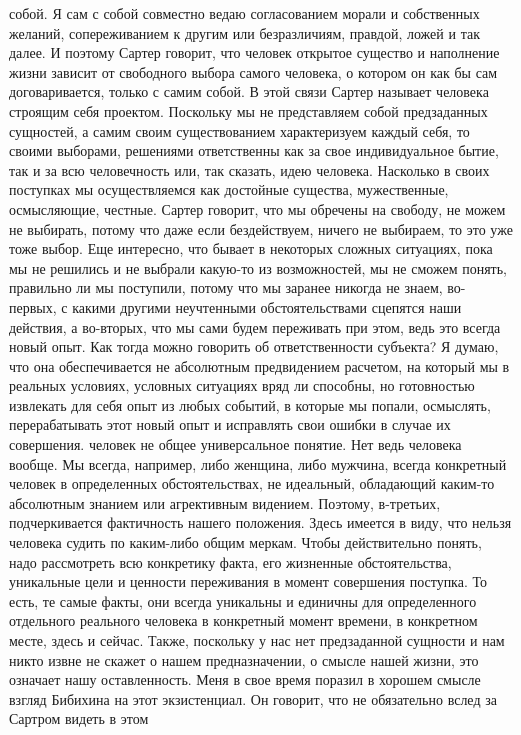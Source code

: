собой. Я сам с собой совместно ведаю согласованием морали и собственных желаний,
сопереживанием к другим или безразличиям, правдой, ложей и так далее. И поэтому
Сартер говорит, что человек открытое существо и наполнение жизни зависит от
свободного выбора самого человека, о котором он как бы сам договаривается,
только с самим собой. В этой связи Сартер называет человека строящим себя
проектом. Поскольку мы не представляем собой предзаданных сущностей, а самим
своим существованием характеризуем каждый себя, то своими выборами, решениями
ответственны как за свое индивидуальное бытие, так и за всю человечность или,
так сказать, идею человека. Насколько в своих поступках мы осуществляемся как
достойные существа, мужественные, осмысляющие, честные. Сартер говорит, что мы
обречены на свободу, не можем не выбирать, потому что даже если бездействуем,
ничего не выбираем, то это уже тоже выбор. Еще интересно, что бывает в некоторых
сложных ситуациях, пока мы не решились и не выбрали какую-то из возможностей, мы
не сможем понять, правильно ли мы поступили, потому что мы заранее никогда не
знаем, во-первых, с какими другими неучтенными обстоятельствами сцепятся наши
действия, а во-вторых, что мы сами будем переживать при этом, ведь это всегда
новый опыт. Как тогда можно говорить об ответственности субъекта? Я думаю, что
она обеспечивается не абсолютным предвидением расчетом, на который мы в реальных
условиях, условных ситуациях вряд ли способны, но готовностью извлекать для себя
опыт из любых событий, в которые мы попали, осмыслять, перерабатывать этот новый
опыт и исправлять свои ошибки в случае их совершения. человек не общее
универсальное понятие. Нет ведь человека вообще. Мы всегда, например, либо
женщина, либо мужчина, всегда конкретный человек в определенных обстоятельствах,
не идеальный, обладающий каким-то абсолютным знанием или агрективным видением.
Поэтому, в-третьих, подчеркивается фактичность нашего положения. Здесь имеется в
виду, что нельзя человека судить по каким-либо общим меркам. Чтобы действительно
понять, надо рассмотреть всю конкретику факта, его жизненные обстоятельства,
уникальные цели и ценности переживания в момент совершения поступка. То есть, те
самые факты, они всегда уникальны и единичны для определенного отдельного
реального человека в конкретный момент времени, в конкретном месте, здесь и
сейчас. Также, поскольку у нас нет предзаданной сущности и нам никто извне не
скажет о нашем предназначении, о смысле нашей жизни, это означает нашу
оставленность. Меня в свое время поразил в хорошем смысле взгляд Бибихина на
этот экзистенциал. Он говорит, что не обязательно вслед за Сартром видеть в этом
